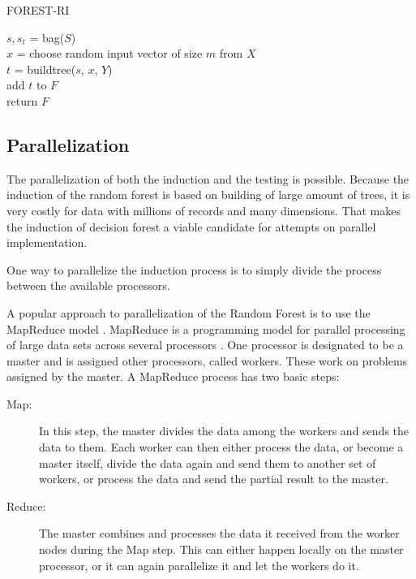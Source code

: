 \documentclass[thesis=B,english]{FITthesis}[2012/10/20]
\begin{document}
	\begin{algorithm}[H]
		\caption{FOREST-RI}
		\label{alg:forestri}
		\Begin
		{
		 {
			$s,s_t$ = bag($S$)\\
			$x$ = choose random input vector of size $m$ from $X$\\
			$t$ = buildtree($s$, $x$, $Y$)\\
			add $t$ to $F$\\

		}
		return $F$
		}

	\end{algorithm} 
	\subsection{Parallelization}
	The parallelization of both the induction and the testing is possible. Because the induction of the random forest is based on building of large amount of trees, it is very costly for data with millions of records and many dimensions. That makes the induction of decision forest a viable candidate for attempts on parallel implementation.

	One way to parallelize the induction process is to simply divide the process between the available processors.

	A popular approach to parallelization of the Random Forest is to use the MapReduce model \cite{SCALABLE_RDF,han2013scalable}. MapReduce is a programming model for parallel processing of large data sets across several processors  \cite{dean2008mapreduce}. One processor is designated to be a master and is assigned other processors, called workers. These work on problems assigned by the master. A MapReduce process has two basic steps:
	\begin{description}
	\item [Map:] In this step, the master divides the data among the workers and sends the data to them. Each worker can then either process the data, or become a master itself, divide the data again and send them to another set of workers, or process the data and send the partial result to the master.
	\item [Reduce:] The master combines and processes the data it received from the worker nodes during the Map step. This can either happen locally on the master processor, or it can again parallelize it and let the workers do it.
	\end{description}
\end{document}
